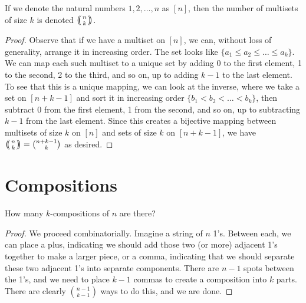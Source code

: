  
 If we denote the natural numbers $1,2,\dots, n$ as $[n]$, then the number of multisets of size $k$ is denoted $\multiset{n}{k}$.
 
 \begin{proof}
 	
 	Observe that if we have a multiset on $[n]$, we can, without loss of generality, arrange it in increasing order.  The set looks like $\{a_1\leq a_2 \leq \dots \leq a_k  \}$.  We can map each such multiset to a unique set by adding 0 to the first element, 1 to the second, 2 to the third, and so on, up to adding $k-1$ to the last element.  To see that this is a unique mapping, we can look at the inverse, where we take a set on $[n+k-1]$ and sort it in increasing order $\{ b_1 < b_2 < \dots < b_k\}$, then subtract 0 from the first element, 1 from the second, and so on, up to subtracting $k-1$ from the last element.  Since this creates a bijective mapping between multisets of size $k$ on $[n]$ and sets of size $k$ on $[n+k-1]$, we have $\multiset{n}{k}=\binom{n+k-1}{k}$ as desired.
 	
 	
 	
 \end{proof}
 
 \section*{Compositions}
 
 
 
 
 How many $k$-compositions of $n$ are there?
 
\begin{proof}
	We proceed combinatorially.  Imagine a string of $n$ 1's.  Between each, we can place a plus, indicating we should add those two (or more) adjacent 1's together to make a larger piece, or a comma, indicating that we should separate these two adjacent 1's into separate components. There are $n-1$ spots between the 1's, and we need to place $k-1$ commas to create a composition into $k$ parts.  There are clearly $\binom{n-1}{k-1}$ ways to do this, and we are done.
\end{proof} 


